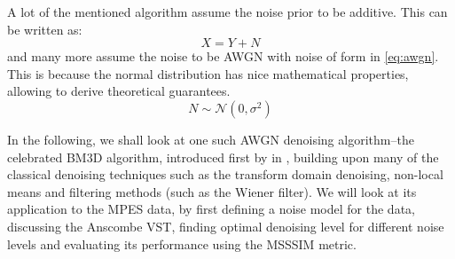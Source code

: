 A lot of the mentioned algorithm assume the noise prior to be additive. This can be written as:
\begin{equation}
    X = Y + N
\end{equation}
%
and many more assume the noise to be \gls{AWGN} with noise of form in \cref{eq:awgn}. This is because the normal distribution has nice mathematical properties, allowing to derive theoretical guarantees.
\begin{equation}\label{eq:awgn}
    N \sim \mathcal{N}(0, \sigma^2)
\end{equation}

In the following, we shall look at one such \gls{AWGN} denoising algorithm--the celebrated \gls{BM3D} algorithm, introduced first by \citeauthor{dabovImageDenoisingSparse2007} in \cite{dabovImageDenoisingSparse2007}, building upon many of the classical denoising techniques such as the  transform domain denoising, non-local means and filtering methods (such as the Wiener filter). We will look at its application to the  \gls{MPES} data, by first defining a noise model for the data, discussing the Anscombe \gls{VST}, finding optimal denoising level for different noise levels and evaluating its performance using the \gls{MSSSIM} metric.

